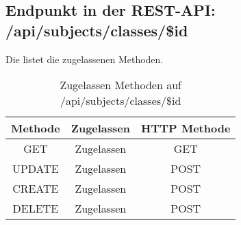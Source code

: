 \subsection{Endpunkt in der REST-API: /api/subjects/classes/\$id}
Die  listet die zugelassenen Methoden. 

\begin{table}[!htbp]
	\begin{tabular}{|c|c|c|}
		\hline
			\textbf{Methode} & \textbf{Zugelassen} & \textbf{HTTP Methode} \\ \hline
			GET & Zugelassen & GET \\ \hline
			UPDATE & Zugelassen & POST \\ \hline 
			CREATE & Zugelassen & POST \\ \hline 
			DELETE & Zugelassen & POST \\ \hline
	\end{tabular}

		\caption{Zugelassen Methoden auf /api/subjects/classes/\$id}
		\label{tab:end:rest:api:subjects:classes:id:meth}
\end{table}